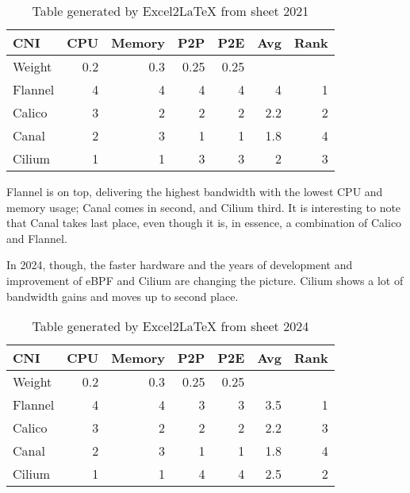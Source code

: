 \begin{table}[H]
  \caption{Table generated by Excel2LaTeX from sheet 2021}
    \begin{tabular}{|l | r | r | r | r| r | r |}
    \hline
    CNI   & CPU & Memory & P2P & P2E & Avg & Rank \\
    \hline\hline
    Weight & 0.2   & 0.3   & 0.25  & 0.25  &       &  \\
    \hline
    Flannel & 4     & 4     & 4     & 4     & 4     & 1 \\
    \hline
    Calico & 3     & 2     & 2     & 2     & 2.2   & 2 \\
    \hline
    Canal & 2     & 3     & 1     & 1     & 1.8   & 4 \\
    \hline
    Cilium & 1     & 1     & 3     & 3     & 2     & 3 \\
    \hline
    \end{tabular}%
  \label{tab:e2l-2021}%
\end{table}%

Flannel is on top, delivering the highest bandwidth with the lowest CPU and memory usage; Canal comes in second, and Cilium third. It is interesting to note that Canal takes last place, even though it is, in essence, a combination of Calico and Flannel. 

In 2024, though, the faster hardware and the years of development and improvement of eBPF and Cilium are changing the picture. Cilium shows a lot of bandwidth gains and moves up to second place.

\begin{table}[htbp]
  \caption{Table generated by Excel2LaTeX from sheet 2024}
    \begin{tabular}{|l | r | r | r | r| r | r |}
    \hline
    CNI   & CPU & Memory & P2P & P2E & Avg & Rank \\
    \hline\hline
    Weight & 0.2   & 0.3   & 0.25  & 0.25  &       &  \\
    \hline
    Flannel & 4     & 4     & 3     & 3     & 3.5   & 1 \\
    \hline
    Calico & 3     & 2     & 2     & 2     & 2.2   & 3 \\
    \hline
    Canal & 2     & 3     & 1     & 1     & 1.8   & 4 \\
    \hline
    Cilium & 1     & 1     & 4     & 4     & 2.5   & 2 \\
    \hline
    \end{tabular}%
  \label{tab:e2l-2024}%
\end{table}%

